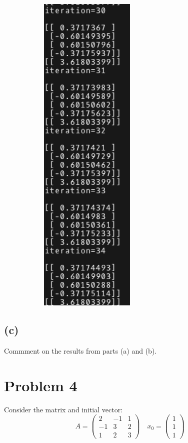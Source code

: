 \documentclass{article}
\begin{document}
\begin{figure}[H]
\begin{subfigure}[b]{0.49\textwidth}
        \includegraphics[width=0.5\textwidth]{p3b2.png}
    \end{subfigure}
\end{figure}
\subsection*{(c)}
Commment on the results from parts (a) and (b).

\section*{Problem 4}
Consider the matrix and initial vector:
\[A=\begin{pmatrix}2 & -1 & 1\\-1&3&2\\1&2&3\end{pmatrix}\quad x_0=\begin{pmatrix}1\\1\\1\end{pmatrix}\]
\end{document}
